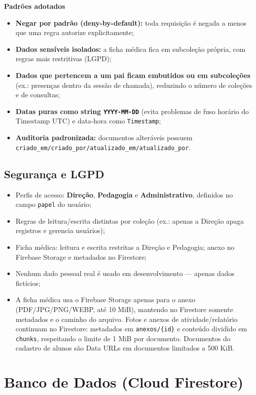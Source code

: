 \documentclass[a4paper,11pt]{article}
\begin{document}
\textbf{Padrões adotados}
\begin{itemize}[nosep]
  \item \textbf{Negar por padrão (deny-by-default):} toda requisição é negada a menos que uma regra autorize explicitamente;
  \item \textbf{Dados sensíveis isolados:} a ficha médica fica em subcoleção própria, com regras mais restritivas (LGPD);
  \item \textbf{Dados que pertencem a um pai ficam embutidos ou em subcoleções} (ex.: presenças dentro da sessão de chamada), reduzindo o número de coleções e de consultas;
  \item \textbf{Datas puras como string \texttt{YYYY-MM-DD}} (evita problemas de fuso horário do Timestamp UTC) e data-hora como \texttt{Timestamp};
  \item \textbf{Auditoria padronizada:} documentos alteráveis possuem \texttt{criado\_em/criado\_por/atualizado\_em/atualizado\_por}.
\end{itemize}

\subsection{Segurança e LGPD}

\begin{itemize}[nosep]
  \item Perfis de acesso: \textbf{Direção}, \textbf{Pedagogia} e \textbf{Administrativo}, definidos no campo \texttt{papel} do usuário;
  \item Regras de leitura/escrita distintas por coleção (ex.: apenas a Direção apaga registros e gerencia usuários);
  \item Ficha médica: leitura e escrita restritas a Direção e Pedagogia; anexo no Firebase Storage e metadados no Firestore;
  \item Nenhum dado pessoal real é usado em desenvolvimento --- apenas dados fictícios;
  \item A ficha médica usa o Firebase Storage apenas para o anexo (PDF/JPG/PNG/WEBP, até 10 MiB), mantendo no Firestore somente metadados e o caminho do arquivo. Fotos e anexos de atividade/relatório continuam no Firestore: metadados em \texttt{anexos/\{id\}} e conteúdo dividido em \texttt{chunks}, respeitando o limite de 1 MiB por documento. Documentos do cadastro de alunos são Data URLs em documentos limitados a 500 KiB.
\end{itemize}

\section{Banco de Dados (Cloud Firestore)}
\end{document}
